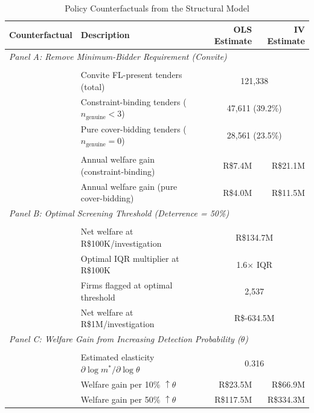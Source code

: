 
\begin{table}[htbp]
\centering
\caption{Policy Counterfactuals from the Structural Model}
\label{tab:counterfactual_welfare}
\small
\begin{tabular}{lp{6.5cm}rr}
\toprule
Counterfactual & Description & OLS Estimate & IV Estimate \\
\midrule
\multicolumn{4}{l}{\textit{Panel A: Remove Minimum-Bidder Requirement (Convite)}} \\
\\[-2pt]
 & Convite FL-present tenders (total) & \multicolumn{2}{c}{121,338} \\
 & Constraint-binding tenders ($n_{\text{genuine}} < 3$) & \multicolumn{2}{c}{47,611 (39.2\%)} \\
 & Pure cover-bidding tenders ($n_{\text{genuine}} = 0$) & \multicolumn{2}{c}{28,561 (23.5\%)} \\
 & & & \\[-4pt]
 & Annual welfare gain (constraint-binding) & R\$7.4M & R\$21.1M \\
 & Annual welfare gain (pure cover-bidding) & R\$4.0M & R\$11.5M \\
\midrule
\multicolumn{4}{l}{\textit{Panel B: Optimal Screening Threshold (Deterrence = 50\%)}} \\
\\[-2pt]
 & Net welfare at R\$100K/investigation & \multicolumn{2}{c}{R\$134.7M} \\
 & Optimal IQR multiplier at R\$100K & \multicolumn{2}{c}{1.6$\times$ IQR} \\
 & Firms flagged at optimal threshold & \multicolumn{2}{c}{2,537} \\
 & Net welfare at R\$1M/investigation & \multicolumn{2}{c}{R\$-634.5M} \\
\midrule
\multicolumn{4}{l}{\textit{Panel C: Welfare Gain from Increasing Detection Probability ($\theta$)}} \\
\\[-2pt]
 & Estimated elasticity $\partial \log m^* / \partial \log \theta$ & \multicolumn{2}{c}{0.316} \\
 & Welfare gain per 10\% $\uparrow\theta$ & R\$23.5M & R\$66.9M \\
 & Welfare gain per 50\% $\uparrow\theta$ & R\$117.5M & R\$334.3M \\

\end{tabular}
\end{table}
